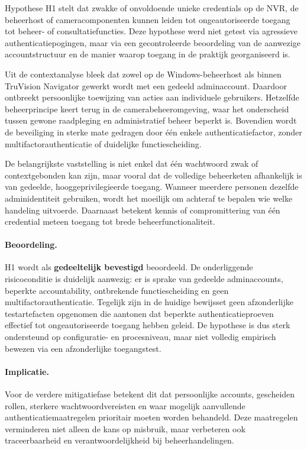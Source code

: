 Hypothese H1 stelt dat zwakke of onvoldoende unieke credentials op de NVR, de beheerhost of cameracomponenten kunnen leiden tot ongeautoriseerde toegang tot beheer- of consultatiefuncties. Deze hypothese werd niet getest via agressieve authenticatiepogingen, maar via een gecontroleerde beoordeling van de aanwezige accountstructuur en de manier waarop toegang in de praktijk georganiseerd is.

Uit de contextanalyse bleek dat zowel op de Windows-beheerhost als binnen TruVision Navigator gewerkt wordt met een gedeeld adminaccount. Daardoor ontbreekt persoonlijke toewijzing van acties aan individuele gebruikers. Hetzelfde beheerprincipe keert terug in de camerabeheeromgeving, waar het onderscheid tussen gewone raadpleging en administratief beheer beperkt is. Bovendien wordt de beveiliging in sterke mate gedragen door één enkele authenticatiefactor, zonder multifactorauthenticatie of duidelijke functiescheiding.

De belangrijkste vaststelling is niet enkel dat één wachtwoord zwak of contextgebonden kan zijn, maar vooral dat de volledige beheerketen afhankelijk is van gedeelde, hooggeprivilegieerde toegang. Wanneer meerdere personen dezelfde adminidentiteit gebruiken, wordt het moeilijk om achteraf te bepalen wie welke handeling uitvoerde. Daarnaast betekent kennis of compromittering van één credential meteen toegang tot brede beheerfunctionaliteit.

\paragraph{Beoordeling.}
H1 wordt als \textbf{gedeeltelijk bevestigd} beoordeeld. De onderliggende risicoconditie is duidelijk aanwezig: er is sprake van gedeelde adminaccounts, beperkte accountability, ontbrekende functiescheiding en geen multifactorauthenticatie. Tegelijk zijn in de huidige bewijsset geen afzonderlijke testartefacten opgenomen die aantonen dat beperkte authenticatieproeven effectief tot ongeautoriseerde toegang hebben geleid. De hypothese is dus sterk ondersteund op configuratie- en procesniveau, maar niet volledig empirisch bewezen via een afzonderlijke toegangstest.

\paragraph{Implicatie.}
Voor de verdere mitigatiefase betekent dit dat persoonlijke accounts, gescheiden rollen, sterkere wachtwoordvereisten en waar mogelijk aanvullende authenticatiemaatregelen prioritair moeten worden behandeld. Deze maatregelen verminderen niet alleen de kans op misbruik, maar verbeteren ook traceerbaarheid en verantwoordelijkheid bij beheerhandelingen.

